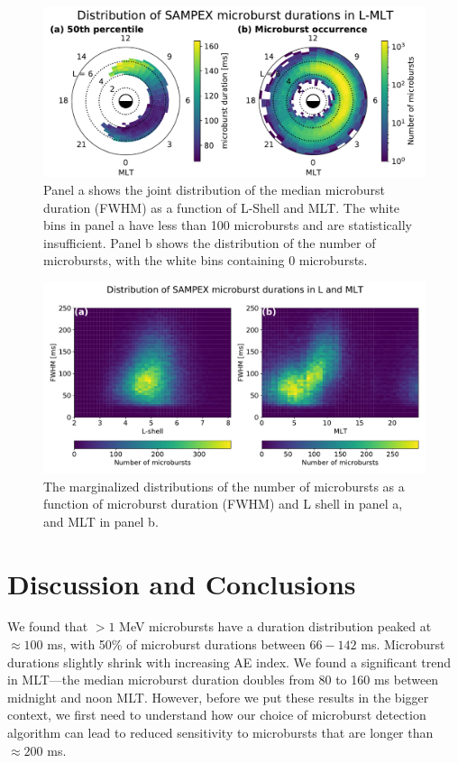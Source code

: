 \documentclass[draft]{agujournal2019}
\begin{document}
\begin{figure}
\noindent\includegraphics[width=\textwidth]{figures/fig3.pdf}
\caption{Panel a shows the joint distribution of the median microburst duration (FWHM) as a function of L-Shell and MLT. The white bins in panel a have less than 100 microbursts and are statistically insufficient. Panel b shows the distribution of the number of microbursts, with the white bins containing 0 microbursts.}
\label{fig3}
\end{figure}

\begin{figure}
\noindent\includegraphics[width=\textwidth]{figures/fig4.pdf}
\caption{The marginalized distributions of the number of microbursts as a function of microburst duration (FWHM) and L shell in panel a, and MLT in panel b.}
\label{fig4}
\end{figure}

\section{Discussion and Conclusions}\label{discussion}

We found that $>1$ MeV microbursts have a duration distribution peaked at $\approx 100$ ms, with 50\% of microburst durations between $66-142$ ms. Microburst durations slightly shrink with increasing AE index. We found a significant trend in MLT---the median microburst duration doubles from 80 to 160 ms between midnight and noon MLT. However, before we put these results in the bigger context, we first need to understand how our choice of microburst detection algorithm can lead to reduced sensitivity to microbursts that are longer than $\approx 200$ ms.
\end{document}

